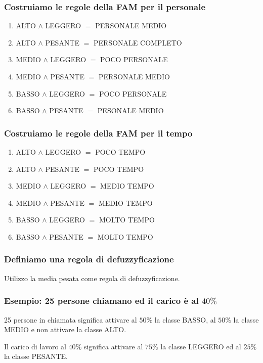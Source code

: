 \documentclass[\main/main.tex]{subfiles}
\begin{document}
\subsubsection*{Costruiamo le regole della FAM per il personale}
\begin{enumerate}
	\item ALTO  $\land$ LEGGERO $=$ PERSONALE MEDIO
	\item ALTO  $\land$ PESANTE $=$ PERSONALE COMPLETO
	\item MEDIO $\land$ LEGGERO $=$ POCO PERSONALE
	\item MEDIO $\land$ PESANTE $=$ PERSONALE MEDIO
	\item BASSO $\land$ LEGGERO $=$ POCO PERSONALE
	\item BASSO $\land$ PESANTE $=$ PESONALE MEDIO
\end{enumerate}

\subsubsection*{Costruiamo le regole della FAM per il tempo}
\begin{enumerate}
	\item ALTO  $\land$ LEGGERO $=$ POCO TEMPO
	\item ALTO  $\land$ PESANTE $=$ POCO TEMPO
	\item MEDIO $\land$ LEGGERO $=$ MEDIO TEMPO
	\item MEDIO $\land$ PESANTE $=$ MEDIO TEMPO
	\item BASSO $\land$ LEGGERO $=$ MOLTO TEMPO
	\item BASSO $\land$ PESANTE $=$ MOLTO TEMPO
\end{enumerate}

\subsubsection*{Definiamo una regola di defuzzyficazione}
Utilizzo la media pesata come regola di defuzzyficazione.

\subsubsection*{Esempio: 25 persone chiamano ed il carico è al $40\%$}
25 persone in chiamata significa attivare al $50\%$ la classe BASSO, al $50\%$ la classe MEDIO e non attivare la classe ALTO.

Il carico di lavoro al $40\%$ significa attivare al $75\%$ la classe LEGGERO ed al $25\%$ la classe PESANTE.
\end{document}

